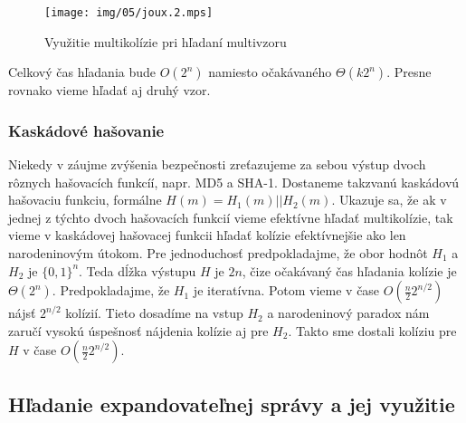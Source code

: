 \begin{figure}[h!]
    \centering
    \texttt{[image: img/05/joux.2.mps]}
    \caption{Využitie multikolízie pri hľadaní multivzoru}
    \label{fig:joux2}
\end{figure}

Celkový čas hľadania bude $O(2^n)$ namiesto očakávaného $\Theta(k 2^n)$.
Presne rovnako vieme hľadať aj druhý vzor.

\subsubsection{Kaskádové hašovanie}
Niekedy v záujme zvýšenia bezpečnosti zreťazujeme za sebou výstup
dvoch rôznych hašovacích funkcíí, napr.
MD5 a SHA-1. Dostaneme takzvanú kaskádovú hašovaciu funkciu,
formálne $H(m) = H_1(m)||H_2(m)$. 
Ukazuje sa, že ak v jednej z týchto dvoch hašovacích funkcií
vieme efektívne hľadať multikolízie, tak vieme
v kaskádovej hašovacej funkcii hľadať kolízie efektívnejšie
ako len narodeninovým útokom.
Pre jednoduchosť predpokladajme, že obor hodnôt $H_1$
a $H_2$ je $\{0,1\}^n$. Teda dĺžka výstupu $H$ je $2n$, čize
očakávaný čas hľadania kolízie je $\Theta(2^n)$.
Predpokladajme, že $H_1$ je iteratívna. Potom vieme v čase 
$O(\frac{n}{2} 2^{n/2})$ nájsť $2^{n/2}$ kolízií. Tieto dosadíme
na vstup $H_2$ a narodeninový paradox nám zaručí
vysokú úspešnosť nájdenia kolízie aj pre $H_2$. Takto sme dostali
kolíziu pre $H$ v čase $O(\frac{n}{2} 2^{n/2})$.

\subsection{Hľadanie expandovateľnej správy a jej využitie}

